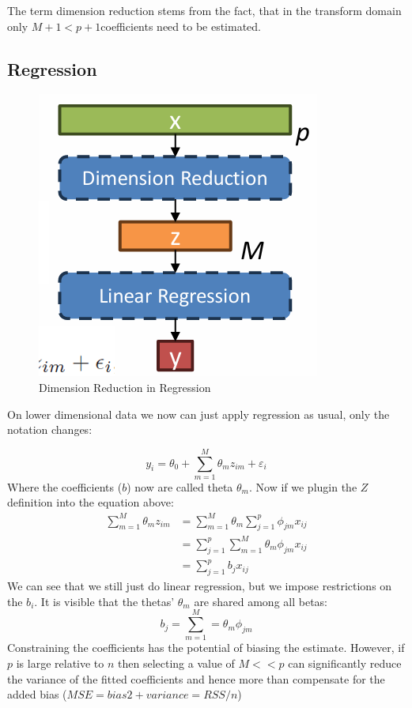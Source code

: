 \documentclass[../Main.tex]{subfiles}
\begin{document}
The term dimension reduction stems from the fact, that in the 
transform domain only \(M+1<p+1\)coefficients need to be estimated.

\subsection{Regression}

\begin{figure}[H]
    \centering
    \includegraphics[width=0.25\linewidth]{Images/dim-reduction-regression.png}
    \caption{Dimension Reduction in Regression}
\end{figure}

On lower dimensional data we now can just apply regression as usual,
only the notation changes:

\begin{equation*}
    y_i = \theta_0 + \sum_{m=1}^{M} \theta_m z_{im} + \varepsilon_i
\end{equation*}
Where the coefficients (\(b\)) now are called theta \(\theta_m\).
Now if we plugin the \(Z\) definition into the equation above:
\begin{equation*}
    \begin{split}
        \sum_{m=1}^{M} \theta_m z_{im} &= \sum_{m=1}^{M}  \theta_m \sum_{j=1}^{p} \phi_{jm}x_{ij} \\
        &= \sum_{j=1}^{p} \sum_{m=1}^{M}  \theta_m  \phi_{jm}x_{ij} \\
        &= \sum_{j=1}^{p} b_j x_{ij}
    \end{split}
\end{equation*}
We can see that we still just do linear regression, but we impose restrictions on the \(b_i\).
It is visible that the thetas' \(\theta_m\) are shared among all betas:
\begin{equation*}
    b_j = \sum_{m=1}^{M} = \theta_m \phi_{jm}
\end{equation*}
Constraining the coefficients has the 
potential of biasing the estimate.
However, if \(p\) is large relative to \(n\) 
then selecting a value of \(M<<p\) can 
significantly reduce the variance of 
the fitted coefficients and hence 
more than compensate for the added 
bias (\(MSE=bias2+variance=RSS/n\))
\end{document}
